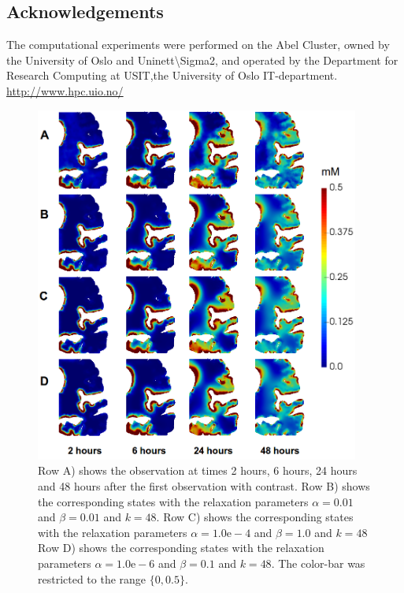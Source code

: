 \documentclass[12pt,a4paper]{article}
\begin{document}
\subsection{Acknowledgements}
The computational experiments were performed on the Abel Cluster, owned by the University of Oslo and Uninett\textbackslash Sigma2, and operated by the Department for Research Computing at USIT,the University of Oslo IT-department. \url{http://www.hpc.uio.no/} 



%



 


\clearpage
 
\begin{figure}
\centering
\includegraphics[width=0.95\textwidth]{../different.png} 
\caption{Row A) shows the observation at times 2 hours, 6 hours, 24 hours and 48 hours after the first observation with contrast. Row B) shows the corresponding states with the relaxation parameters $\alpha=0.01$ and $\beta=0.01$ and $k=48$.   Row C) shows the corresponding states with the relaxation parameters $\alpha=1.0\mathrm{e-4}$ and $\beta=1.0$ and $k=48$
 Row D) shows the corresponding states with the relaxation parameters $\alpha=1.0\mathrm{e-6}$ and $\beta=0.1$ and $k=48$. The color-bar was restricted to the range $ \lbrace 0 ,0.5 \rbrace$. }
\label{Fig::realdata}
\end{figure}
\end{document}
